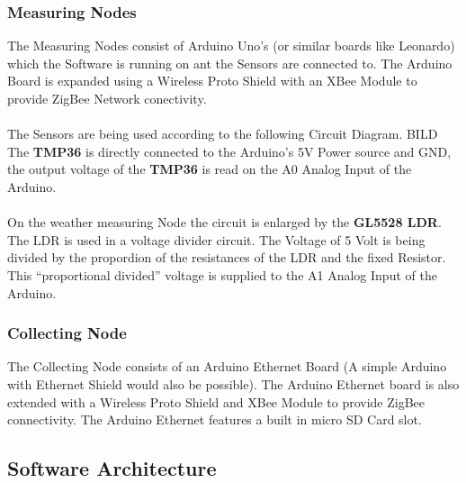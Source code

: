 \documentclass[
	11pt,
	a4paper
]{article}%
\begin{document}
\subsubsection{Measuring Nodes}
The Measuring Nodes consist of Arduino Uno's (or similar boards like Leonardo) which the Software is running on ant the Sensors are connected to. The Arduino Board is expanded using a Wireless Proto Shield with an XBee Module to provide ZigBee Network conectivity.
\\\\
The Sensors are being used according to the following Circuit Diagram.
BILD
The \textbf{TMP36} is directly connected to the Arduino's 5V Power source and GND, the output voltage of the \textbf{TMP36} is read on the A0 Analog Input of the Arduino.
\\\\
On the weather measuring Node the circuit is enlarged by the \textbf{GL5528 LDR}. The LDR is used in a voltage divider circuit. The Voltage of 5 Volt is being divided by the propordion of the resistances of the LDR and the fixed Resistor. This “proportional divided” voltage is supplied to the A1 Analog Input of the Arduino.

\subsubsection{Collecting Node}
The Collecting Node consists of an Arduino Ethernet Board (A simple Arduino with Ethernet Shield would also be possible). The Arduino Ethernet board is also extended with a Wireless Proto Shield and XBee Module to provide ZigBee connectivity. The Arduino Ethernet features a built in micro SD Card slot.

\subsection{Software Architecture}
\end{document}
